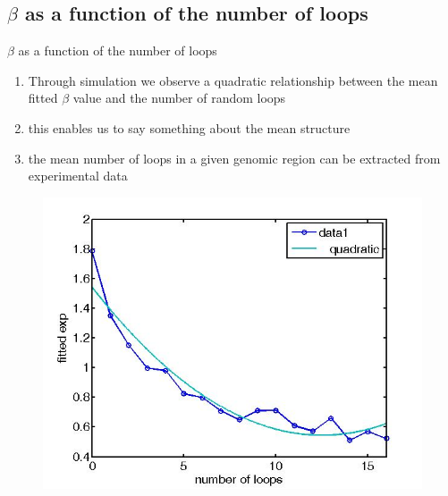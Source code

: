 \documentclass[8pt]{beamer}
\begin{document}
\subsection{$\beta$ as a function of the number of loops}\label{subsection_betaAsAFunctionOfTheNumberOfLoops}
\begin{frame}{$\beta$ as a function of the number of loops}
\begin{enumerate}
\item Through simulation we observe a quadratic relationship between the mean fitted $\beta$ value and the number of random loops
\item this enables us to say something about the mean structure
\item the mean number of loops in a given genomic region can be extracted from experimental data
\end{enumerate}
\begin{figure}[H]
\includegraphics[scale=0.2]{changeOfExponentAsAfunctionOfLoopsStableLoopModelVariableLoops32Beads}
\end{figure}
\end{frame}
\end{document}
